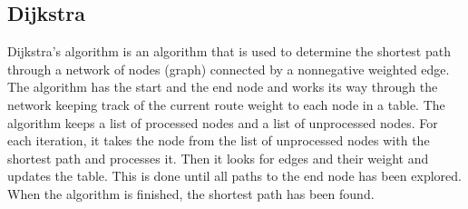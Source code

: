 \subsection{Dijkstra}
Dijkstra's algorithm is an algorithm that is used to determine the shortest path through a network of nodes (graph) connected by a nonnegative weighted edge. The algorithm has the start and the end node and works its way through the network keeping track of the current route weight to each node in a table. The algorithm keeps a list of processed nodes and a list of unprocessed nodes. For each iteration, it takes the node from the list of unprocessed nodes with the shortest path and processes it. Then it looks for edges and their weight and updates the table. This is done until all paths to the end node has been explored. When the algorithm is finished, the shortest path has been found.